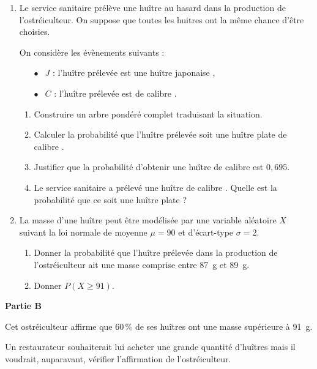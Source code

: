 \documentclass[10pt]{article}
\begin{document}
\begin{enumerate}
\item Le service sanitaire prélève une huître au hasard dans la production de l'ostréiculteur. On suppose que toutes les huitres ont la même chance d'être choisies.
 
On considère les évènements suivants : 

\setlength\parindent{8mm}
\begin{itemize}
\item[$\bullet~~$] $J$ : \og l'huître prélevée est une huître japonaise \fg, 
\item[$\bullet~~$] $C$ : \og l'huître prélevée est de calibre  \fg.
\end{itemize}
\setlength\parindent{0mm}
 
	\begin{enumerate}
		\item Construire un arbre pondéré complet traduisant la situation. 
		\item Calculer la probabilité que l'huître prélevée soit une huître plate de calibre . 
		\item Justifier que la probabilité d'obtenir une huître de calibre  est $0,695$. 
		\item Le service sanitaire a prélevé une huître de calibre . 
Quelle est la probabilité que ce soit une huître plate ?
	\end{enumerate} 
\item La masse d'une huître peut être modélisée par une variable aléatoire $X$ suivant la loi normale de moyenne $\mu = 90$ et d'écart-type $\sigma = 2$. 
	\begin{enumerate}
		\item Donner la probabilité que l'huître prélevée dans la production de l'ostréiculteur ait une masse comprise entre 87~g et 89~g. 
		\item Donner $P(X \geqslant 91)$.
	\end{enumerate}
\end{enumerate}

\bigskip
	 
\textbf{Partie B}

\medskip
 
Cet ostréiculteur affirme que 60\,\% de ses huîtres ont une masse supérieure à 91~g.
 
Un restaurateur souhaiterait lui acheter une grande quantité d'huîtres mais il voudrait, auparavant, vérifier l'affirmation de l'ostréiculteur.
\end{document}
